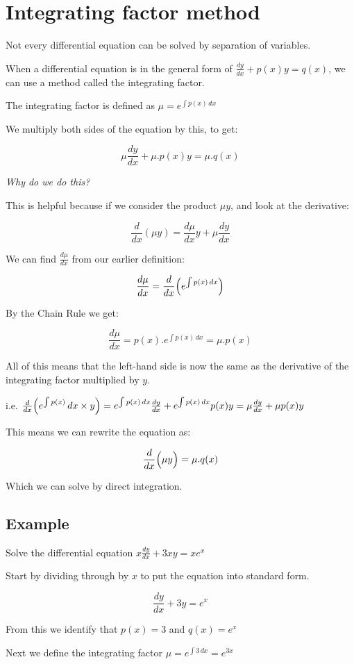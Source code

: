 \documentclass[../main.tex]{subfiles}
\begin{document}
\section{Integrating factor method}
Not every differential equation can be solved by separation of variables.

When a differential equation is in the general form of $\frac{dy}{dx}+p(x)y=q(x)$, we can use a method called the integrating factor.

The integrating factor is defined as $\mu=e^{\int p(x)\,dx}$

We multiply both sides of the equation by this, to get:

\[\mu \frac{dy}{dx}+\mu.p(x)y=\mu.q(x)\]

\textit{Why do we do this?}

This is helpful because if we consider the product $\mu y$, and look at the derivative:

\[\frac{d}{dx}(\mu y)=\frac{d\mu}{dx}y+\mu\frac{dy}{dx}\]

We can find $\frac{d\mu}{dx}$ from our earlier definition:

\[\frac{d\mu}{dx}=\frac{d}{dx}\Bigl(e^{\int p(x)\,dx}\Bigr)\]

By the Chain Rule we get:

\[\frac{d\mu}{dx}=p(x).e^{\int p(x)\,dx}=\mu.p(x)\]

All of this means that the left-hand side is now the same as the derivative of the integrating factor multiplied by $y$.

i.e. $\frac{d}{dx}\Bigl(e^{\int p(x)}\,dx \times y\Bigr)=e^{\int p(x)\,dx}\frac{dy}{dx}+e^{\int p(x)\,dx}p(x)y=\mu \frac{dy}{dx}+\mu p(x)y$

This means we can rewrite the equation as:

\[\frac{d}{dx}\Bigl(\mu y\Bigr)=\mu.q(x)\]

Which we can solve by direct integration.


\pagebreak
\subsection*{Example}
Solve the differential equation $x\frac{dy}{dx}+3xy=xe^x$

Start by dividing through by $x$ to put the equation into standard form.

\[\frac{dy}{dx}+3y=e^x\]

From this we identify that $p(x)=3$ and $q(x)=e^x$

Next we define the integrating factor $\mu=e^{\int 3\,dx}=e^{3x}$
\end{document}
